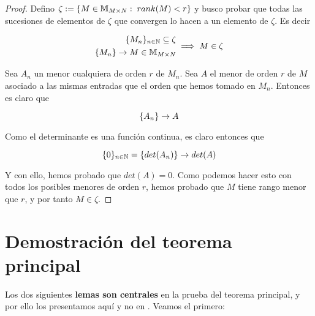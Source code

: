 \begin{proof}
    Defino $\zeta := \{ M \in \mathbb{M}_{M \times N}: \; rank(M) < r \}$ y busco probar que todas las sucesiones de elementos de $\zeta$ que convergen lo hacen a un elemento de $\zeta$. Es decir

    \begin{equation}
        \begin{split}
            \{ M_n \}_{n \in \mathbb{N}} \subseteq \zeta \\
            \{ M_n \} \to M \in \mathbb{M}_{M \times N} \\
        \end{split}
        \implies M \in \zeta
    \end{equation}

    Sea $A_n$ un menor cualquiera de orden $r$ de $M_n$. Sea $A$ el menor de orden $r$ de $M$ asociado a las mismas entradas que el orden que hemos tomado en $M_n$. Entonces es claro que

    \begin{equation}
        \{ A_n \} \to A
    \end{equation}

    Como el determinante es una función continua, es claro entonces que

    \begin{equation}
        \{ 0 \}_{n \in \mathbb{N}} = \{ det(A_n) \} \to det(A)
    \end{equation}

    Y con ello, hemos probado que $det(A) = 0$. Como podemos hacer esto con todos los posibles menores de orden $r$, hemos probado que $M$ tiene rango menor que $r$, y por tanto $M \in \zeta$.
\end{proof}

\section{Demostración del teorema principal}

Los dos siguientes \textbf{lemas son centrales} en la prueba del teorema principal, y por ello los presentamos aquí y no en . Veamos el primero:

